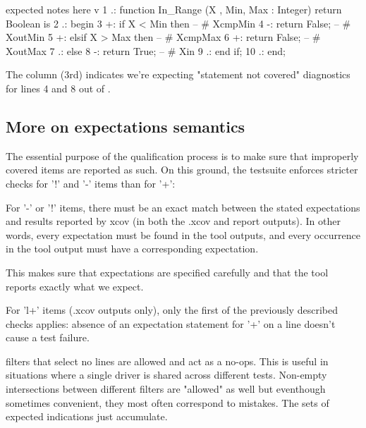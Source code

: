 \documentclass {report}
\begin{document}
\begin{Text}
      expected notes here
        v
      1 .: function In_Range (X , Min, Max : Integer) return Boolean is
      2 .: begin
      3 +:    if X < Min then     -- # XcmpMin
      4 -:       return False;    -- # XoutMin
      5 +:    elsif X > Max then  -- # XcmpMax
      6 +:       return False;    -- # XoutMax
      7 .:    else
      8 -:       return True;     -- # Xin
      9 .:    end if;
     10 .: end;
\end{Text}

The  column (3rd) indicates we're expecting
"statement not covered" diagnostics for lines 4 and 8 out of .

\subsection {More on expectations semantics}

The essential purpose of the qualification process is to make sure that
improperly covered items are reported as such.
%
On this ground, the testsuite enforces stricter checks for '!' and '-' items
than for '+':

\begin{Itemize}
\item%
  For '-' or '!' items, there must be an exact match between the stated
  expectations and results reported by xcov (in both the .xcov and report
  outputs).
  In other words, every expectation must be found in the tool outputs, and
  every occurrence in the tool output must have a corresponding expectation.

  This makes sure that expectations are specified carefully and that the
  tool reports exactly what we expect.
%
\item%
  For 'l+' items (.xcov outputs only), only the first of the previously
  described checks applies: absence of an expectation statement for
  '+' on a line doesn't cause a test failure.
\end{Itemize}

 filters that select no lines are allowed and act as a
no-ops. This is useful in situations where a single driver is shared across
different tests.
%
Non-empty intersections between different filters are "allowed" as well but
eventhough sometimes convenient, they most often correspond to mistakes.
%
The sets of expected indications just accumulate.

\end{document}
